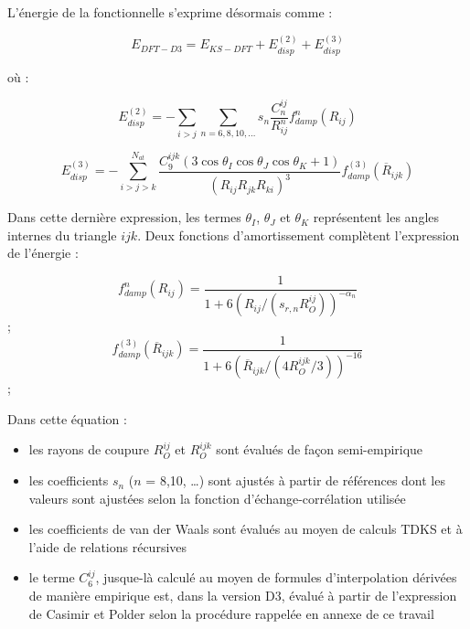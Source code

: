 {	L'énergie de la fonctionnelle s’exprime désormais comme :
	
	\begin{equation}
	E_{DFT-D3} = E_{KS-DFT} + E_{disp}^{(2)} + E_{disp}^{(3)}
	\end{equation}
	
	où : 
	
	\begin{equation}
	E_{disp}^{(2)}=- \sum_{i>j} \sum_{n=6,8,10,…} s_{n} \frac{C_{n}^{ij}}{R_{ij}^{n}} f_{damp}^{n} (R_{ij})
	\end{equation}
	
	\begin{equation}
	E_{disp}^{(3)}= -\sum_{i>j>k}^{N_{at}} \frac{C_{9}^{ijk}(3\cos\theta_{I}\cos\theta_{J}\cos\theta_{K}+ 1)}{(R_{ij} R_{jk} R_{ki})^{3}} f_{damp}^{(3)} (\overline{R}_{ijk})
	\end{equation}
	
	Dans cette dernière expression, les termes $\theta_{I}$, $\theta_{J}$ et $\theta_{K}$ représentent les angles internes du triangle $ijk$. Deux fonctions d'amortissement complètent l’expression de l’énergie :
	
	\begin{multicols}{2}
		\begin{equation} f_{damp}^{n} (R_{ij}) =\frac{1}{1+6(R_{ij} / (s_{r,n} R_{O}^{ij}))^{-\alpha_{n}}} \end{equation}   ;  
		\begin{equation} f_{damp}^{(3)} (\overline{R}_{ijk}) =\frac{1}{1+6(\overline{R}_{ijk} / (4 R_{O}^{ijk}/3))^{-16}}\end{equation}; 
	\end{multicols}
	
	Dans cette équation : 
	\begin{itemize}
	\item les rayons de coupure $R_{O}^{ij}$ et $R_{O}^{ijk}$ sont évalués de façon semi-empirique
	\item les coefficients $s_{n}$ ($n$ = 8,10, \dots) sont ajustés à partir de références dont les valeurs sont ajustées selon la fonction d’échange-corrélation utilisée
	\item les coefficients de van der Waals sont évalués au moyen de calculs TDKS et à l’aide de relations récursives
	\item le terme $C_{6}^{ij}$, jusque-là calculé au moyen de formules d’interpolation dérivées de manière empirique est, dans la version D3, évalué à partir de l’expression de Casimir et Polder selon la procédure rappelée en annexe de ce travail
	\end{itemize}
	
}
